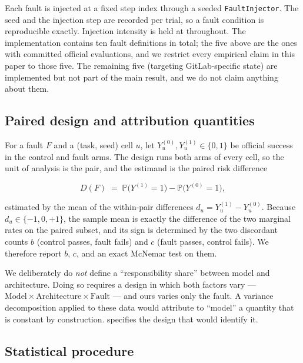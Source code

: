 Each fault is injected at a fixed step index through a seeded
\texttt{FaultInjector}. The seed and the injection step are recorded per trial, so
a fault condition is reproducible exactly. Injection intensity is held at
\FaultIntensity{} throughout. The implementation contains ten fault
definitions in total; the five above are the ones with committed official
evaluations, and we restrict every empirical claim in this paper to those five.
The remaining five (targeting GitLab-specific state) are implemented but not part
of the main result, and we do not claim anything about them.

\subsection{Paired design and attribution quantities}
\label{sec:attribution}

For a fault $F$ and a (task, seed) cell $u$, let
$Y_u^{(0)}, Y_u^{(1)} \in \{0,1\}$ be official success in the control and fault
arms. The design runs both arms of every cell, so the unit of analysis is the
pair, and the estimand is the paired risk difference

\begin{equation}
  D(F) \;=\; \mathbb{P}\bigl(Y^{(1)} = 1\bigr) - \mathbb{P}\bigl(Y^{(0)} = 1\bigr),
\end{equation}

estimated by the mean of the within-pair differences
$d_u = Y_u^{(1)} - Y_u^{(0)}$. Because $d_u \in \{-1,0,+1\}$, the sample mean is
exactly the difference of the two marginal rates on the paired subset, and its
sign is determined by the two discordant counts $b$ (control passes, fault fails)
and $c$ (fault passes, control fails). We therefore report $b$, $c$, and an exact
McNemar test on them.

We deliberately do \emph{not} define a ``responsibility share'' between model and
architecture. Doing so requires a design in which both factors vary ---
$\mathrm{Model} \times \mathrm{Architecture} \times \mathrm{Fault}$ --- and ours
varies only the fault. A variance decomposition applied to these data would
attribute to ``model'' a quantity that is constant by construction.
 specifies the design that would identify it.

\subsection{Statistical procedure}
\label{sec:stats}

